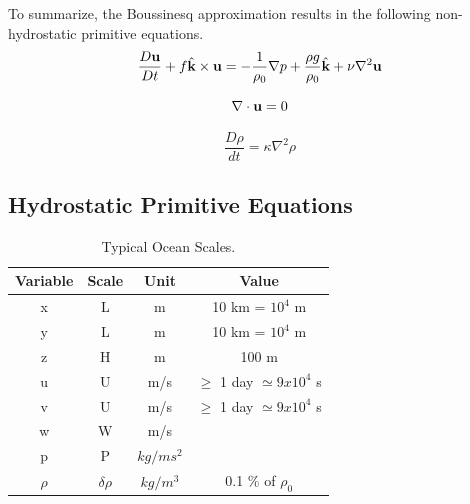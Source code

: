 To summarize, the Boussinesq approximation results in the following non-hydrostatic primitive equations.
%
\begin{equation}\label{e:xmom_nh}
    \frac{D {\bf u}}{Dt} + f  \hat{\bf k} \times {\bf u}= - \frac{1}{\rho_0} \nabla p + \frac{\rho g}{\rho_0} \hat{\bf k} + \nu \nabla^{2} {\bf u}
\end{equation}

\begin{equation}\label{e:cont_nh}
   \nabla \cdot {\bf u} = 0
\end{equation}

\begin{equation}\label{e:ener_nh}
   \frac{D \rho}{dt} = \kappa \nabla ^2 \rho
\end{equation}

\subsection{Hydrostatic Primitive Equations}

\begin{center}
\begin{table}
\centering
\begin{tabular}{|c|c|c|c|}
\hline
\textbf{Variable} & \textbf{Scale}  &   \textbf{Unit}  & \textbf{Value}  \\
\hline
x & L & m & 10 km = $10^4$ m \\

y & L & m & 10 km = $10^4$ m \\

z & H & m & 100 m \\

u & U & m/s & $\geq$ 1 day $\simeq 9 x 10^4$ s \\

v & U & m/s & $\geq$ 1 day $\simeq 9 x 10^4$ s \\

w & W & m/s &  \\

p & P & $kg/ms^2$ & \\

$\rho$ & $\delta \rho$ & $kg/m^3$ & 0.1 \% of $\rho_0$ \\

\hline
\end{tabular} \\[1ex]
\caption[Typical ocean scales]{Typical Ocean Scales.  \cite{94CushRoi}}
\label{t:scales2}
\end{table}
\end{center}

